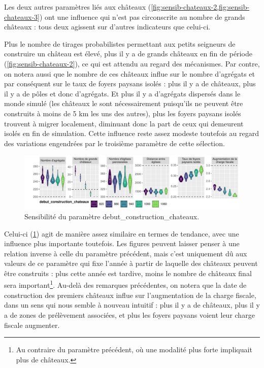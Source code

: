 Les deux autres paramètres liés aux châteaux (\cref{fig:sensib-chateaux-2,fig:sensib-chateaux-3}) ont une influence qui n'est pas circonscrite au nombre de grands châteaux : tous deux agissent sur d'autres indicateurs que celui-ci.

Plus le nombre de tirages probabilistes permettant aux petits seigneurs de construire un château est élevé, plus il y a de grands châteaux en fin de période (\cref{fig:sensib-chateaux-2}), ce qui est attendu au regard des mécanismes.
Par contre, on notera aussi que le nombre de ces châteaux influe sur le nombre d'agrégats et par conséquent sur le taux de foyers paysans isolés :
plus il y a de châteaux, plus il y a de pôles et donc d'agrégats.
Et plus il y a d'agrégats dispersés dans le monde simulé (les châteaux le sont nécessairement puisqu'ils ne peuvent être construits à moins de 5 km les uns des autres), plus les foyers paysans isolés trouvent à migrer localement, diminuant donc la part de ceux qui demeurent isolés en fin de simulation.
Cette influence reste assez modeste toutefois au regard des variations engendrées par le troisième paramètre de cette sélection.

\begin{figure}[H]
	\centering
	\includegraphics[width=\linewidth]{img/sensib/sensibilite_debut_construction_chateaux.pdf}
	\caption{Sensibilité du paramètre \textsf{debut\_construction\_chateaux}.}
	\label{fig:sensib-chateaux-3}
\end{figure}

Celui-ci (\cref{fig:sensib-chateaux-3}) agit de manière assez similaire en termes de tendance, avec une influence plus importante toutefois.
Les figures peuvent laisser penser à une relation inverse à celle du paramètre précédent, mais c'est uniquement dû aux valeurs de ce paramètre qui fixe l'année à partir de laquelle des châteaux peuvent être construits : plus cette année est tardive, moins le nombre de châteaux final sera important\footnote{
	Au contraire du paramètre précédent, où une modalité plus forte impliquait plus de châteaux.
}.
Au-delà des remarques précédentes, on notera que la date de construction des premiers châteaux influe sur l'augmentation de la charge fiscale, dans un sens qui nous semble à nouveau intuitif : plus il y a de châteaux, plus il y a de zones de prélèvement associées, et plus les foyers paysans voient leur charge fiscale augmenter.

